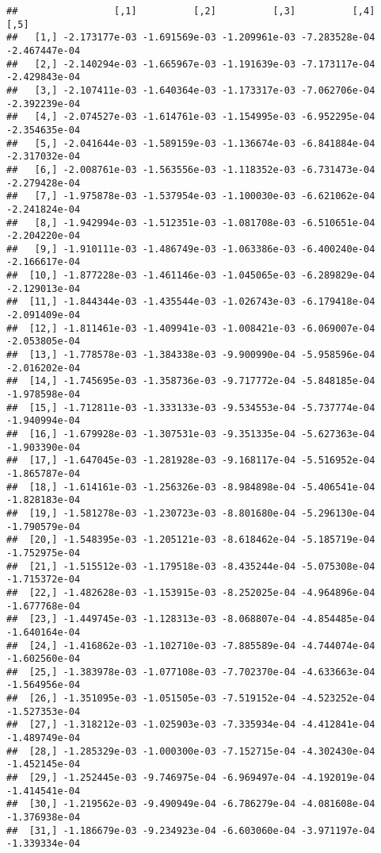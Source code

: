 \documentclass[
]{article}
\begin{document}
\begin{verbatim}
##                 [,1]          [,2]          [,3]          [,4]          [,5]
##   [1,] -2.173177e-03 -1.691569e-03 -1.209961e-03 -7.283528e-04 -2.467447e-04
##   [2,] -2.140294e-03 -1.665967e-03 -1.191639e-03 -7.173117e-04 -2.429843e-04
##   [3,] -2.107411e-03 -1.640364e-03 -1.173317e-03 -7.062706e-04 -2.392239e-04
##   [4,] -2.074527e-03 -1.614761e-03 -1.154995e-03 -6.952295e-04 -2.354635e-04
##   [5,] -2.041644e-03 -1.589159e-03 -1.136674e-03 -6.841884e-04 -2.317032e-04
##   [6,] -2.008761e-03 -1.563556e-03 -1.118352e-03 -6.731473e-04 -2.279428e-04
##   [7,] -1.975878e-03 -1.537954e-03 -1.100030e-03 -6.621062e-04 -2.241824e-04
##   [8,] -1.942994e-03 -1.512351e-03 -1.081708e-03 -6.510651e-04 -2.204220e-04
##   [9,] -1.910111e-03 -1.486749e-03 -1.063386e-03 -6.400240e-04 -2.166617e-04
##  [10,] -1.877228e-03 -1.461146e-03 -1.045065e-03 -6.289829e-04 -2.129013e-04
##  [11,] -1.844344e-03 -1.435544e-03 -1.026743e-03 -6.179418e-04 -2.091409e-04
##  [12,] -1.811461e-03 -1.409941e-03 -1.008421e-03 -6.069007e-04 -2.053805e-04
##  [13,] -1.778578e-03 -1.384338e-03 -9.900990e-04 -5.958596e-04 -2.016202e-04
##  [14,] -1.745695e-03 -1.358736e-03 -9.717772e-04 -5.848185e-04 -1.978598e-04
##  [15,] -1.712811e-03 -1.333133e-03 -9.534553e-04 -5.737774e-04 -1.940994e-04
##  [16,] -1.679928e-03 -1.307531e-03 -9.351335e-04 -5.627363e-04 -1.903390e-04
##  [17,] -1.647045e-03 -1.281928e-03 -9.168117e-04 -5.516952e-04 -1.865787e-04
##  [18,] -1.614161e-03 -1.256326e-03 -8.984898e-04 -5.406541e-04 -1.828183e-04
##  [19,] -1.581278e-03 -1.230723e-03 -8.801680e-04 -5.296130e-04 -1.790579e-04
##  [20,] -1.548395e-03 -1.205121e-03 -8.618462e-04 -5.185719e-04 -1.752975e-04
##  [21,] -1.515512e-03 -1.179518e-03 -8.435244e-04 -5.075308e-04 -1.715372e-04
##  [22,] -1.482628e-03 -1.153915e-03 -8.252025e-04 -4.964896e-04 -1.677768e-04
##  [23,] -1.449745e-03 -1.128313e-03 -8.068807e-04 -4.854485e-04 -1.640164e-04
##  [24,] -1.416862e-03 -1.102710e-03 -7.885589e-04 -4.744074e-04 -1.602560e-04
##  [25,] -1.383978e-03 -1.077108e-03 -7.702370e-04 -4.633663e-04 -1.564956e-04
##  [26,] -1.351095e-03 -1.051505e-03 -7.519152e-04 -4.523252e-04 -1.527353e-04
##  [27,] -1.318212e-03 -1.025903e-03 -7.335934e-04 -4.412841e-04 -1.489749e-04
##  [28,] -1.285329e-03 -1.000300e-03 -7.152715e-04 -4.302430e-04 -1.452145e-04
##  [29,] -1.252445e-03 -9.746975e-04 -6.969497e-04 -4.192019e-04 -1.414541e-04
##  [30,] -1.219562e-03 -9.490949e-04 -6.786279e-04 -4.081608e-04 -1.376938e-04
##  [31,] -1.186679e-03 -9.234923e-04 -6.603060e-04 -3.971197e-04 -1.339334e-04

\end{verbatim}
\end{document}
